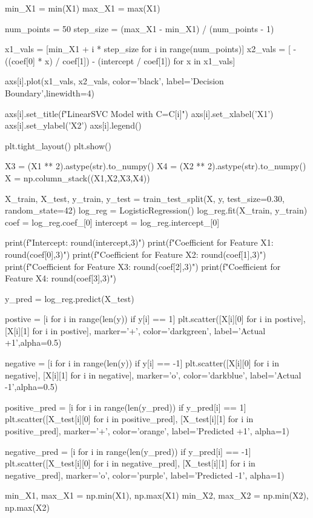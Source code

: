 \documentclass{article}
\begin{document}
\begin{python}
    min_X1 = min(X1)
    max_X1 = max(X1)

    num_points = 50
    step_size = (max_X1 - min_X1) / (num_points - 1)

    x1_vals = [min_X1 + i * step_size for i in range(num_points)]
    x2_vals = [ -((coef[0] * x) / coef[1]) - (intercept / coef[1]) for x in x1_vals]

    axs[i].plot(x1_vals, x2_vals, color='black', label='Decision Boundary',linewidth=4)
    
    axs[i].set_title(f"LinearSVC Model with C={C[i]}")
    axs[i].set_xlabel('X1')
    axs[i].set_ylabel('X2')
    axs[i].legend()

plt.tight_layout()
plt.show()

X3 = (X1 ** 2).astype(str).to_numpy()
X4 = (X2 ** 2).astype(str).to_numpy()
X = np.column_stack((X1,X2,X3,X4))

X_train, X_test, y_train, y_test = train_test_split(X, y, test_size=0.30, random_state=42)
log_reg = LogisticRegression()
log_reg.fit(X_train, y_train)
coef = log_reg.coef_[0]
intercept = log_reg.intercept_[0] 

print(f"Intercept: {round(intercept,3)}")
print(f"Coefficient for Feature X1: {round(coef[0],3)}")
print(f"Coefficient for Feature X2: {round(coef[1],3)}")
print(f"Coefficient for Feature X3: {round(coef[2],3)}")
print(f"Coefficient for Feature X4: {round(coef[3],3)}")

y_pred = log_reg.predict(X_test)

postive = [i for i in range(len(y)) if y[i] == 1]
plt.scatter([X[i][0] for i in postive], [X[i][1] for i in postive], marker='+', color='darkgreen', label='Actual +1',alpha=0.5)

negative = [i for i in range(len(y)) if y[i] == -1]
plt.scatter([X[i][0] for i in negative], [X[i][1] for i in negative], marker='o', color='darkblue', label='Actual -1',alpha=0.5)

positive_pred = [i for i in range(len(y_pred)) if y_pred[i] == 1]
plt.scatter([X_test[i][0] for i in positive_pred], [X_test[i][1] for i in positive_pred], marker='+', color='orange', label='Predicted +1', alpha=1)

negative_pred = [i for i in range(len(y_pred)) if y_pred[i] == -1]
plt.scatter([X_test[i][0] for i in negative_pred], [X_test[i][1] for i in negative_pred], marker='o', color='purple', label='Predicted -1', alpha=1)


min_X1, max_X1 = np.min(X1), np.max(X1)
min_X2, max_X2 = np.min(X2), np.max(X2)


\end{python}
\end{document}
